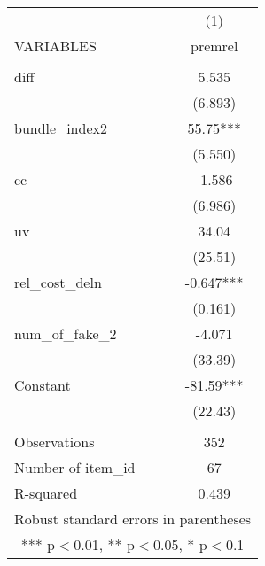 \documentclass[]{article}
\begin{document}
\begin{tabular}{lc} \hline
 & (1) \\
VARIABLES & premrel \\ \hline
 &  \\
diff & 5.535 \\
 & (6.893) \\
bundle\_index2 & 55.75*** \\
 & (5.550) \\
cc & -1.586 \\
 & (6.986) \\
uv & 34.04 \\
 & (25.51) \\
rel\_cost\_deln & -0.647*** \\
 & (0.161) \\
num\_of\_fake\_2 & -4.071 \\
 & (33.39) \\
Constant & -81.59*** \\
 & (22.43) \\
 &  \\
Observations & 352 \\
Number of item\_id & 67 \\
 R-squared & 0.439 \\ \hline
\multicolumn{2}{c}{ Robust standard errors in parentheses} \\
\multicolumn{2}{c}{ *** p$<$0.01, ** p$<$0.05, * p$<$0.1} \\
\end{tabular}
\end{document}
